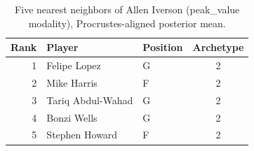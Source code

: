 \begin{table}[htbp]
  \centering\small
  \begin{tabular}{rllc}
    \toprule
    Rank & Player & Position & Archetype \\
    \midrule
    1 & Felipe Lopez & G & 2 \\
    2 & Mike Harris & F & 2 \\
    3 & Tariq Abdul-Wahad & G & 2 \\
    4 & Bonzi Wells & G & 2 \\
    5 & Stephen Howard & F & 2 \\
    \bottomrule
  \end{tabular}
  \caption{Five nearest neighbors of Allen Iverson (peak_value modality), Procrustes-aligned posterior mean.}
  \label{tab:Allen_Iverson_neighbors_peak_value}
\end{table}

